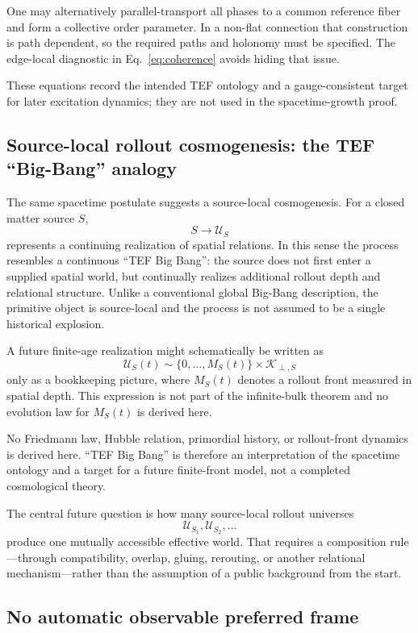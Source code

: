 \documentclass[11pt]{article}
\newcommand{\cU}{\mathcal{U}}
\newcommand{\cK}{\mathcal{K}}
\begin{document}
One may alternatively parallel-transport all phases to a common reference fiber and form a collective order parameter. In a non-flat connection that construction is path dependent, so the required paths and holonomy must be specified. The edge-local diagnostic in Eq.~\eqref{eq:coherence} avoids hiding that issue.

These equations record the intended TEF ontology and a gauge-consistent target for later excitation dynamics; they are not used in the spacetime-growth proof.

\subsection{Source-local rollout cosmogenesis: the TEF ``Big-Bang'' analogy}

The same spacetime postulate suggests a source-local cosmogenesis. For a closed matter source \(S\),
\[
S\longrightarrow \cU_S
\]
represents a continuing realization of spatial relations. In this sense the process resembles a continuous ``TEF Big Bang'': the source does not first enter a supplied spatial world, but continually realizes additional rollout depth and relational structure. Unlike a conventional global Big-Bang description, the primitive object is source-local and the process is not assumed to be a single historical explosion.

A future finite-age realization might schematically be written as
\begin{equation}
\cU_S(t)
\sim
\{0,\ldots,M_S(t)\}\times\cK_{\perp,S}
\end{equation}
only as a bookkeeping picture, where \(M_S(t)\) denotes a rollout front measured in spatial depth. This expression is not part of the infinite-bulk theorem and no evolution law for \(M_S(t)\) is derived here.

No Friedmann law, Hubble relation, primordial history, or rollout-front dynamics is derived here. ``TEF Big Bang'' is therefore an interpretation of the spacetime ontology and a target for a future finite-front model, not a completed cosmological theory.

The central future question is how many source-local rollout universes
\[
\cU_{S_1},\cU_{S_2},\ldots
\]
produce one mutually accessible effective world. That requires a composition rule---through compatibility, overlap, gluing, rerouting, or another relational mechanism---rather than the assumption of a public background from the start.

\subsection{No automatic observable preferred frame}
\end{document}
